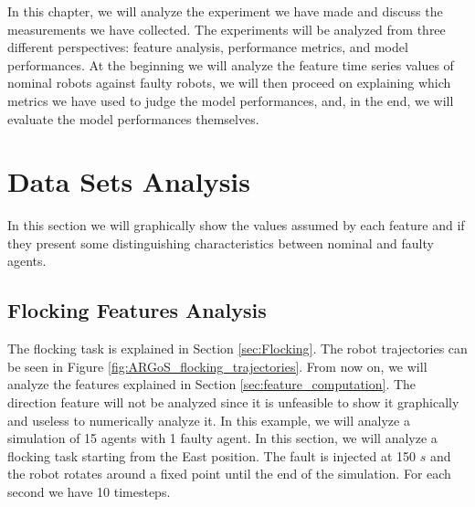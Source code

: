 \documentclass[../../Thesis.tex]{subfiles}
\begin{document}
	In this chapter, we will analyze the experiment we have made and discuss the measurements we have collected. The experiments will be analyzed from three different perspectives: feature analysis, performance metrics, and model performances. At the beginning we will analyze the feature time series values of nominal robots against faulty robots, we will then proceed on explaining which metrics we have used to judge the model performances, and, in the end, we will evaluate the model performances themselves.
	
	\section{Data Sets Analysis}
		In this section we will graphically show the values assumed by each feature and if they present some distinguishing characteristics between nominal and faulty agents. 
		\subsection{Flocking Features Analysis}
		\label{sec:Experiments:flocking_feature_analysis}
			The flocking task is explained in Section \ref{sec:Flocking}. The robot trajectories can be seen in Figure \ref{fig:ARGoS_flocking_trajectories}. From now on, we will analyze the features explained in Section \ref{sec:feature_computation}. The direction feature will not be analyzed since it is unfeasible to show it graphically and useless to numerically analyze it. In this example, we will analyze a simulation of 15 agents with 1 faulty agent. In this section, we will analyze a flocking task starting from the East position. The fault is injected at 150 $s$ and the robot rotates around a fixed point until the end of the simulation. For each second we have 10 timesteps.
			
\end{document}
